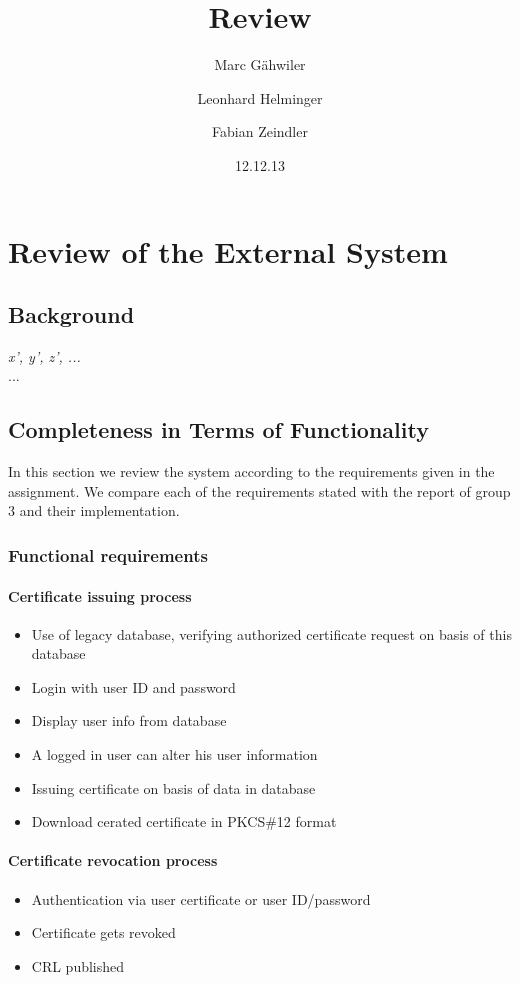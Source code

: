 \documentclass{report}
\title{\huge\sffamily\bfseries Review}
\author{Marc G\"ahwiler \and Leonhard Helminger \and Fabian Zeindler}
\date{12.12.13}
\begin{document}
\maketitle

\tableofcontents
\pagebreak



\chapter{Review of the External System}

\section{Background}

 {\it x', y', z', ...} \\

 ...

\section{Completeness in Terms of Functionality} 
In this section we review the system according to the requirements given in the assignment. We compare each of the requirements stated with the report of group 3 and their implementation.
\subsection{Functional requirements}
\subsubsection{Certificate issuing process}
\begin{itemize}
\item Use of legacy database, verifying authorized certificate request on basis of this database \checkmark 
\item Login with user ID and password \checkmark
\item Display user info from database \checkmark
\item A logged in user can alter his user information \checkmark
\item Issuing certificate on basis of data in database \checkmark
\item Download cerated certificate in PKCS\#12 format \checkmark
\end{itemize}
\subsubsection{Certificate revocation process}
\begin{itemize}
\item Authentication via user certificate or user ID/password \checkmark
\item Certificate gets revoked \checkmark
\item CRL published \checkmark
\end{itemize}
\end{document}

